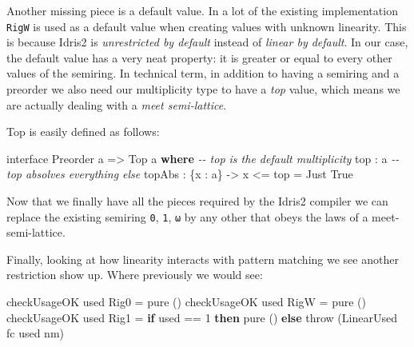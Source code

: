 \documentclass[
]{article}
\newenvironment{Shaded}{}{}
\newcommand{\CommentTok}[1]{\textcolor[rgb]{0.38,0.63,0.69}{\textit{#1}}}
\newcommand{\DataTypeTok}[1]{\textcolor[rgb]{0.56,0.13,0.00}{#1}}
\newcommand{\DecValTok}[1]{\textcolor[rgb]{0.25,0.63,0.44}{#1}}
\newcommand{\FunctionTok}[1]{\textcolor[rgb]{0.02,0.16,0.49}{#1}}
\newcommand{\KeywordTok}[1]{\textcolor[rgb]{0.00,0.44,0.13}{\textbf{#1}}}
\newcommand{\NormalTok}[1]{#1}
\newcommand{\OperatorTok}[1]{\textcolor[rgb]{0.40,0.40,0.40}{#1}}
\newcommand{\OtherTok}[1]{\textcolor[rgb]{0.00,0.44,0.13}{#1}}
\begin{document}
Another missing piece is a default value. In a lot of the existing
implementation \texttt{RigW} is used as a default value when creating
values with unknown linearity. This is because Idris2 is
\emph{unrestricted by default} instead of \emph{linear by default}. In
our case, the default value has a very neat property: it is greater or
equal to every other values of the semiring. In technical term, in
addition to having a semiring and a preorder we also need our
multiplicity type to have a \emph{top} value, which means we are
actually dealing with a \emph{meet semi-lattice}.

Top is easily defined as follows:

\begin{Shaded}
\begin{Highlighting}[]
\NormalTok{interface }\DataTypeTok{Preorder}\NormalTok{ a }\OtherTok{=\textgreater{}} \DataTypeTok{Top}\NormalTok{ a }\KeywordTok{where}
  \CommentTok{{-}{-} top is the default multiplicity}
\NormalTok{  top }\OperatorTok{:}\NormalTok{ a}
  \CommentTok{{-}{-} top absolves everything else}
\NormalTok{  topAbs }\OperatorTok{:}\NormalTok{ \{x }\OperatorTok{:}\NormalTok{ a\} }\OtherTok{{-}\textgreater{}}\NormalTok{ x }\OperatorTok{\textless{}=}\NormalTok{ top }\OtherTok{=} \DataTypeTok{Just} \DataTypeTok{True}
\end{Highlighting}
\end{Shaded}

Now that we finally have all the pieces required by the Idris2 compiler
we can replace the existing semiring \texttt{0}, \texttt{1}, \texttt{ω}
by any other that obeys the laws of a meet-semi-lattice.

Finally, looking at how linearity interacts with pattern matching we see
another restriction show up. Where previously we would see:

\begin{Shaded}
\begin{Highlighting}[]
\NormalTok{checkUsageOK used }\DataTypeTok{Rig0} \OtherTok{=} \FunctionTok{pure}\NormalTok{ ()}
\NormalTok{checkUsageOK used }\DataTypeTok{RigW} \OtherTok{=} \FunctionTok{pure}\NormalTok{ ()}
\NormalTok{checkUsageOK used }\DataTypeTok{Rig1}
         \OtherTok{=} \KeywordTok{if}\NormalTok{ used }\OperatorTok{==} \DecValTok{1}
              \KeywordTok{then} \FunctionTok{pure}\NormalTok{ ()}
              \KeywordTok{else}\NormalTok{ throw (}\DataTypeTok{LinearUsed}\NormalTok{ fc used nm)}
\end{Highlighting}
\end{Shaded}
\end{document}
